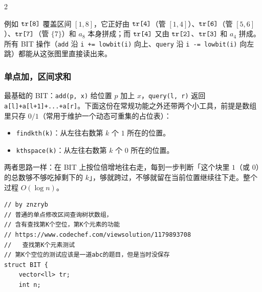 \begin{multicols*}{2}
\begin{center}
	\end{center}

	例如 $\verb|tr[8]|$ 覆盖区间 $[1,8]$，它正好由 $\verb|tr[4]|$（管 $[1,4]$）、$\verb|tr[6]|$（管 $[5,6]$）、$\verb|tr[7]|$（管 $\{7\}$）和 $a_8$ 本身拼成；而 $\verb|tr[4]|$ 又由 $\verb|tr[2]|$、$\verb|tr[3]|$ 和 $a_4$ 拼成。所有 BIT 操作（\verb|add| 沿 \verb|i += lowbit(i)| 向上、\verb|query| 沿 \verb|i -= lowbit(i)| 向左跳）都能从这张图里直接读出来。

	\subsubsection{单点加，区间求和}

	最基础的 BIT：\verb|add(p, x)| 给位置 $p$ 加上 $x$，\verb|query(l, r)| 返回 \verb|a[l]+a[l+1]+...+a[r]|。下面这份在常规功能之外还带两个小工具，前提是数组里只存 $0/1$（常用于维护一个动态可重集的占位表）：

	\begin{itemize}
		\item \verb|findkth(k)|：从左往右数第 $k$ 个 $1$ 所在的位置。
		\item \verb|kthspace(k)|：从左往右数第 $k$ 个 $0$ 所在的位置。
	\end{itemize}

	两者思路一样：在 BIT 上按位倍增地往右走，每到一步判断「这个块里 $1$（或 $0$）的总数够不够吃掉剩下的 $k$」，够就跨过，不够就留在当前位置继续往下走。整个过程 $O(\log n)$。

	\begin{verbatim}
// by znzryb
// 普通的单点修改区间查询树状数组，
// 含有查找第K个空位，第K个元素的功能
// https://www.codechef.com/viewsolution/1179893708
//   查找第K个元素测试
// 第K个空位的测试应该是一道abc的题目，但是当时没保存
struct BIT {
	vector<ll> tr;
	int n;


\end{verbatim}
\end{multicols*}

